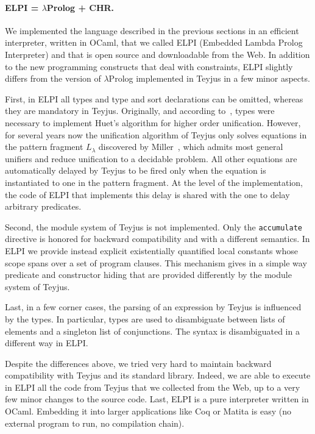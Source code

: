 \documentclass{easychair}
\begin{document}
\paragraph{ELPI = $\lambda$Prolog + CHR.}\label{sec:elpi}

We implemented the language described in the previous sections in an efficient interpreter, written in OCaml, that we called ELPI (Embedded Lambda Prolog Interpreter) and that is open source and downloadable from the Web.
In addition to the new programming constructs that deal with
constraints, ELPI slightly differs from the version of $\lambda$Prolog
implemented in Teyjus in a few minor aspects.

First, in ELPI all types and type and sort declarations can be omitted, whereas
	they are mandatory in Teyjus. Originally, and according
	to~\cite{jlp98}, types were necessary to implement Huet's algorithm for
	higher order unification. However, for several years now the
	unification algorithm of Teyjus only solves equations in the pattern
	fragment $L_\lambda$ discovered by Miller~\cite{patternfrag}, which admits most
	general unifiers and reduce unification to a decidable problem. All
	other equations are automatically delayed by Teyjus to be fired only
	when the equation is instantiated to one in the pattern fragment. At
	the level of the implementation, the code of ELPI that implements this
	delay is shared with the one to delay arbitrary predicates.

Second, the module system of Teyjus is not implemented. Only the
	\verb+accumulate+ directive is honored for backward compatibility and
	with a different semantics. In ELPI we provide instead explicit
	existentially quantified local constants whose scope spans over a set
	of program clauses. This mechanism gives in a simple way predicate and
	constructor hiding that are provided differently by the module system
	of Teyjus.

	Last, in a few corner cases, the parsing of an expression by Teyjus is
	influenced by the types. In particular, types are used to disambiguate
	between lists of elements and a singleton list of conjunctions. The
	syntax is disambiguated in a different way in ELPI.

Despite the differences above, we tried very hard to maintain backward
compatibility with Teyjus and its standard library. Indeed, we are able to
execute in ELPI all the code from Teyjus that we collected from the Web, up to
a very few minor changes to the source code.
Last, ELPI is a pure interpreter written in OCaml.  Embedding it into
larger applications like Coq or Matita is easy (no external program to
run, no compilation chain).
\end{document}
